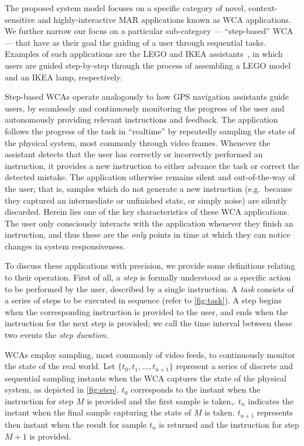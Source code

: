 
The proposed system model focuses on a specific category of novel, context-sensitive and highly-interactive \gls{MAR} applications known as \gls{WCA} applications.
We further narrow our focus on a particular sub-category --- ``step-based'' \gls{WCA} --- that have as their goal the guiding of a user through sequential tasks.
Examples of such applications are the LEGO and IKEA assistants~\cite{chen2015early,chen2018application}, in which users are guided step-by-step through the process of assembling a LEGO model and an IKEA lamp, respectively.

Step-based \glspl{WCA} operate analogously to how \gls{GPS} navigation assistants guide users, by seamlessly and continuously monitoring the progress of the user and autonomously providing relevant instructions and feedback.
The application follows the progress of the task in ``realtime'' by repeatedly sampling the state of the physical system, most commonly through video frames.
Whenever the assistant detects that the user has correctly or incorrectly performed an instruction, it provides a new instruction to either advance the task or correct the detected mistake.
The application otherwise remains silent and out-of-the-way of the user;
that is, samples which do not generate a new instruction (e.g.~because they captured an intermediate or unfinished state, or simply noise) are silently discarded.
Herein lies one of the key characteristics of these \gls{WCA} applications.
The user only consciously interacts with the application whenever they finish an instruction, and thus these are the \emph{only} points in time at which they can notice changes in system responsiveness.

To discuss these applications with precision, we provide some definitions relating to their operation.
First of all, a \emph{step} is formally understood as a specific action to be performed by the user, described by a single instruction. 
A \emph{task} consists of a series of steps to be executed in sequence (refer to \cref{fig:task}).
A step begins when the corresponding instruction is provided to the user, and ends when the instruction for the next step is provided; we call the time interval between these two events the \emph{step duration}.

\glspl{WCA} employ sampling, most commonly of video feeds, to continuously monitor the state of the real world.
Let \( \{ t_0, t_1, \ldots, t_{n + 1} \} \) represent a series of discrete and sequential sampling instants when the \gls{WCA} captures the state of the physical system, as depicted in \cref{fig:step}.
\( t_0 \) corresponds to the instant when the instruction for step \( M \) is provided and the first sample is taken,. 
\( t_n \) indicates the instant when the final sample capturing the state of \( M \) is taken. 
\( t_{n + 1} \) represents then instant when the result for sample \( t_n \) is returned and the instruction for step \( M + 1 \) is provided.

